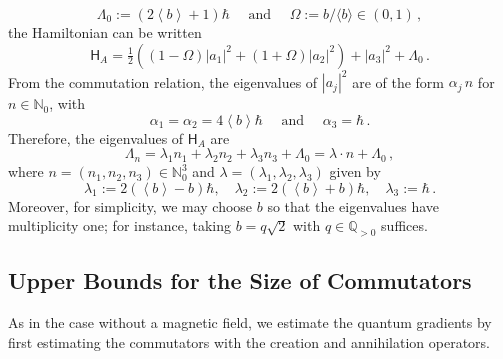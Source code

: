 \documentclass[11pt]{amsart}
\theoremstyle{plain}
\theoremstyle{definition}
\newcommand		{\N}		{\mathbb N}			%
\newcommand		\sfH		{\mathsf H}			%
\newcommand		{\lt}			{\left}				%
\newcommand		{\rt}			{\right}			%
\renewcommand	{\(}			{\lt(}
\renewcommand	{\)}			{\rt)}
\newcommand		{\bangle}[1]	{\lt\langle #1\rt\rangle}
\newcommand		{\weight}[1]	{\bangle{#1}}	%
\newcommand		{\n}[1]			{\lt\lvert #1 \rt\rvert}
\begin{document}
	\begin{equation*}
		\Lambda_0 := \lt(2 \weight{b}+1\rt)\hbar \quad \text{ and } \quad \Omega := b/\langle b\rangle \in (0,1) \, ,
	\end{equation*}
	the Hamiltonian can be written
	\begin{equation*}
		\sfH_A = \tfrac{1}{2}\lt(\lt(1-\Omega\rt) \n{a_1}^2 + \lt(1+\Omega\rt) \n{a_2}^2\rt) + \n{a_3}^2 + \Lambda_0 \, .
	\end{equation*}
	From the commutation relation, the eigenvalues of $\n{a_j}^2$ are of the form $\alpha_j \, n$ for $n\in\N_0$, with
    \begin{equation}\label{def:alphas}
        \alpha_1 = \alpha_2 = 4\weight{b}\hbar \quad \text{ and } \quad \alpha_3 = \hbar \, .
	\end{equation}
    Therefore, the eigenvalues of $\sfH_A$ are
    \begin{equation}\label{eq:magn_eigen}
        \Lambda_n = \lambda_1 n_1 + \lambda_2 n_2 + \lambda_3 n_3 + \Lambda_0 = \lambda \cdot n +\Lambda_0\,,
    \end{equation}
    where $n = (n_1,n_2,n_3)\in\N_0^3$ and $\lambda = (\lambda_1, \lambda_2, \lambda_3)$ given by
    \begin{equation}\label{eq:lambda_weights}
        \lambda_1 := 2 \lt(\weight{b}-b\rt)\hbar,\quad \lambda_2 := 2 \lt(\weight{b}+b\rt)\hbar,\quad \lambda_3 := \hbar \, .
    \end{equation}
    Moreover, for simplicity, we may choose $b$ so that the eigenvalues have multiplicity one; for instance, taking $b = q\sqrt{2}$ with $q \in \mathbb{Q}_{>0}$ suffices.


\subsection{Upper Bounds for the Size of Commutators}\label{sec:withMagnet-upperbound} 
    As in the case without a magnetic field, we estimate the quantum gradients by first estimating the commutators with the creation and annihilation operators. 
    
\end{document}
